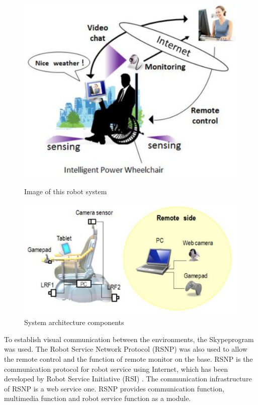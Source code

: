 \begin{figure}[!htbp]
\center
\begin{minipage}{0.495\linewidth}
\center
\captionsetup{justification=centering,margin=0.5cm,font=small}
\includegraphics[width=0.8\linewidth]{img/cap3/mitsumuraSolutions}
\caption{ Image of this robot system \cite{mitsumura2014} } \label{subfig:mitsumuraSolutions}
\end{minipage}
\begin{minipage}{0.495\linewidth}
\center
\captionsetup{justification=centering,margin=0cm,font=small}
\includegraphics[width=1\linewidth]{img/cap3/mitsumuraArchitecture}
\caption{System architecture components \cite{mitsumura2014} } \label{subfig:mitsumuraArchitecture}
\end{minipage}
\end{figure}


To establish visual communication between the environments, the Skype\texttrademark \hspace{3pt}program was used. The Robot Service Network Protocol (RSNP) was also used to allow the remote control and the function of remote monitor on the base. RSNP is the communication protocol for robot service using Internet, which has been developed by Robot Service Initiative (RSI) \cite{Rsi2020}. The communication infrastructure of RSNP is a web service one. RSNP provides communication function, multimedia function and robot service function as a module.

